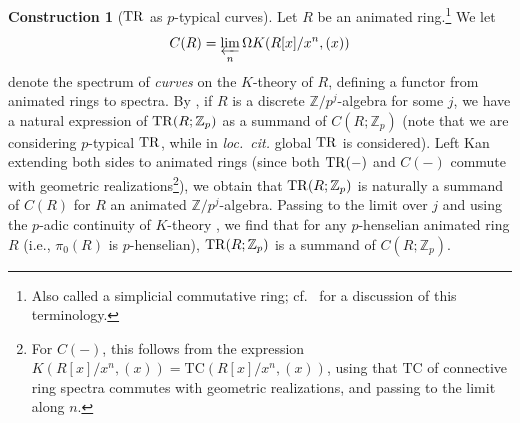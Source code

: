 \documentclass{amsart}
\theoremstyle{definition}
\newtheorem{construction}[theorem]{Construction}
\newcommand{\TC}{\mathrm{TC}}
\begin{document}
\begin{construction}[$\mathrm{TR}$ as $p$-typical curves] 
Let $R$ be an animated ring.\footnote{Also called a simplicial commutative
ring; cf.~\cite{CS} for a discussion of this terminology.} 
We let \begin{equation} \label{curvesR} C(R) = \varprojlim_n \Omega K( R[x]/x^n, (x))
\end{equation} denote the spectrum of
\emph{curves} on the $K$-theory of $R$, defining a functor from animated
rings to spectra. 
By \cite[Th.~3.1.9]{Hes96}, 
if $R$ is a discrete $\mathbb{Z}/p^j$-algebra for some $j$, we have
a natural 
expression of $\mathrm{TR}(R; \mathbb{Z}_p)$ as a summand of $C(R; \mathbb{Z}_p)$ (note
that we are considering $p$-typical $\mathrm{TR}$, while in \emph{loc.~cit.} global
$\mathrm{TR}$ is considered). 
Left Kan extending both sides  to animated rings (since both $\mathrm{TR}(-)$ and $C(-)$ commute with
geometric realizations\footnote{For $C(-)$, this follows from the expression
$K(R[x]/x^n, (x)) = \TC(R[x]/x^n, (x))$, using that $\TC$ of connective 
ring spectra commutes with geometric realizations, and passing to the limit
along $n$.}), we obtain that $\mathrm{TR}(R; \mathbb{Z}_p) $ is naturally a
summand of $C(R)$ for $R$ an animated $\mathbb{Z}/p^j$-algebra. 
Passing to the limit over $j$ and using the $p$-adic continuity of $K$-theory
\cite[Th.~5.21]{CMM}, we find that 
for any $p$-henselian animated ring
$R$ (i.e., $\pi_0(R)$ is $p$-henselian), 
$\mathrm{TR}(R; \mathbb{Z}_p)$ is a summand of $C(R; \mathbb{Z}_p)$. 
\label{ptypiccurves}
\end{construction} 
\end{document}
